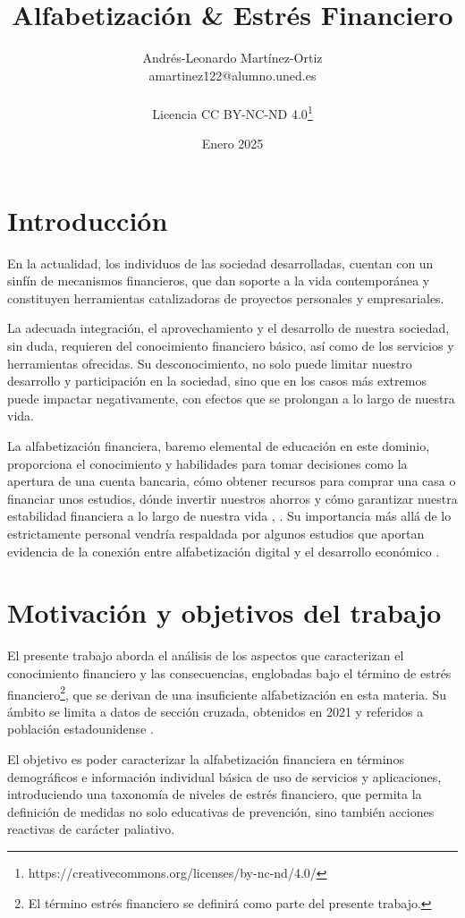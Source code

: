 \documentclass[a4paper, 11pt]{article}
\title{Alfabetización \& Estrés Financiero}
\author{Andrés-Leonardo Martínez-Ortiz \\ amartinez122@alumno.uned.es\\
\\
Licencia CC BY-NC-ND 4.0\footnote{https://creativecommons.org/licenses/by-nc-nd/4.0/ }}
\date{Enero 2025}
\begin{document}
\maketitle
\clearpage
\tableofcontents
\clearpage
\section{Introducción}
\label{sec:introduction}
En la actualidad, los individuos de las sociedad desarrolladas, cuentan con 
un sinfín de mecanismos financieros, que dan soporte a la vida contemporánea
y constituyen herramientas catalizadoras de proyectos personales y empresariales. 

La adecuada integración, el aprovechamiento y el desarrollo de
nuestra sociedad, sin duda, requieren del conocimiento financiero básico, así como
de los servicios y herramientas ofrecidas. Su desconocimiento, no solo puede limitar
nuestro desarrollo y participación en la sociedad, sino que en los casos más extremos
puede impactar negativamente, con efectos que se prolongan a lo largo de nuestra
vida. 

La alfabetización financiera, baremo elemental de educación en este dominio, 
proporciona el conocimiento y habilidades para tomar decisiones como la 
apertura de una cuenta bancaria, cómo obtener recursos para comprar una
casa o financiar unos estudios, dónde invertir nuestros ahorros y cómo 
garantizar nuestra estabilidad financiera a lo largo de nuestra vida
\cite{EU01}, \cite{OCDE01}. Su importancia más allá de lo estrictamente personal 
vendría respaldada por algunos estudios que aportan evidencia de
la conexión entre alfabetización digital y el desarrollo económico \cite{Lusardi14}. 

\section{Motivación y objetivos del trabajo}
\label{sec:motivation}
El presente trabajo aborda el análisis de los aspectos que caracterizan el conocimiento
financiero y las consecuencias, englobadas bajo el término de estrés 
financiero\footnote{El término estrés financiero se definirá como parte del presente 
trabajo.}, que se derivan de una insuficiente alfabetización en esta materia. Su ámbito se 
limita a datos de sección cruzada, obtenidos en 2021 y referidos a población estadounidense 
\cite{NFCS01}.

El objetivo es poder caracterizar la alfabetización financiera en términos demográficos e 
información individual básica de uso de servicios y aplicaciones, introduciendo una taxonomía 
de niveles de estrés financiero, que permita la definición de medidas no solo educativas de 
prevención, sino también acciones reactivas de carácter paliativo.
\end{document}
